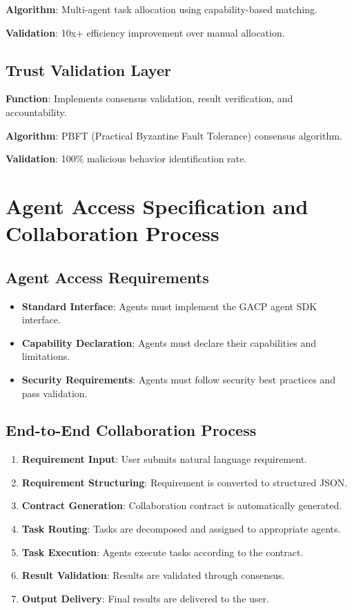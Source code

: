 \documentclass[11pt,twocolumn]{article}
\begin{document}
\textbf{Algorithm}: Multi-agent task allocation using capability-based matching.

\textbf{Validation}: 10x+ efficiency improvement over manual allocation.

\subsection{Trust Validation Layer}
\textbf{Function}: Implements consensus validation, result verification, and accountability.

\textbf{Algorithm}: PBFT (Practical Byzantine Fault Tolerance) consensus algorithm.

\textbf{Validation}: 100\% malicious behavior identification rate.

\section{Agent Access Specification and Collaboration Process}

\subsection{Agent Access Requirements}
\begin{itemize}
  \item \textbf{Standard Interface}: Agents must implement the GACP agent SDK interface.
  \item \textbf{Capability Declaration}: Agents must declare their capabilities and limitations.
  \item \textbf{Security Requirements}: Agents must follow security best practices and pass validation.
\end{itemize}

\subsection{End-to-End Collaboration Process}
\begin{enumerate}
  \item \textbf{Requirement Input}: User submits natural language requirement.
  \item \textbf{Requirement Structuring}: Requirement is converted to structured JSON.
  \item \textbf{Contract Generation}: Collaboration contract is automatically generated.
  \item \textbf{Task Routing}: Tasks are decomposed and assigned to appropriate agents.
  \item \textbf{Task Execution}: Agents execute tasks according to the contract.
  \item \textbf{Result Validation}: Results are validated through consensus.
  \item \textbf{Output Delivery}: Final results are delivered to the user.
\end{enumerate}
\end{document}
